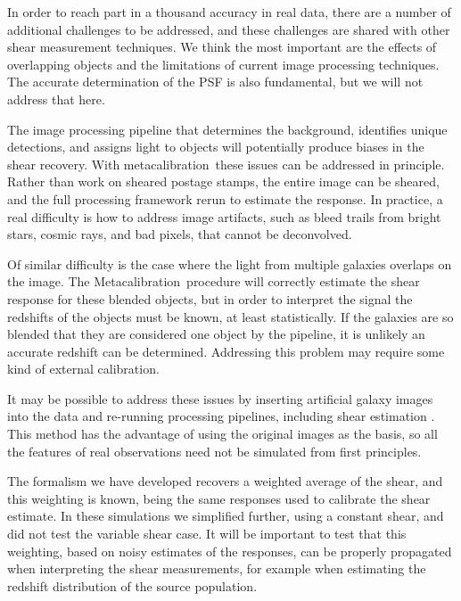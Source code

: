\documentclass[iop]{emulateapj}
\newcommand{\mcal}{metacalibration}
\newcommand{\Mcal}{Metacalibration}
\begin{document}
In order to reach part in a thousand accuracy in real data, there are a number
of additional challenges to be addressed, and these challenges are shared with
other shear measurement techniques. We think the most important are the effects
of overlapping objects and the limitations of current image processing
techniques.  The accurate determination of the PSF is also fundamental, but we
will not address that here.

The image processing pipeline that  determines the background, identifies
unique detections, and assigns light to objects will potentially produce biases
in the shear recovery.  With \mcal\ these issues can be addressed in principle.
Rather than work on sheared postage stamps, the entire image can be sheared,
and the full processing framework rerun to estimate the response.  In practice,
a real difficulty is how to address image artifacts, such as bleed trails from
bright stars, cosmic rays, and bad pixels, that cannot be deconvolved.

Of similar difficulty is the case where the light from multiple galaxies
overlaps on the image.  The \Mcal\ procedure will correctly estimate the shear
response for these blended objects, but in order to interpret the signal the
redshifts of the objects must be known, at least statistically.  If the
galaxies are so blended that they are considered one object by the pipeline, it
is unlikely an accurate redshift can be determined.  Addressing this problem
may require some kind of external calibration.

It may be possible to address these issues by inserting artificial galaxy
images into the data and re-running processing pipelines, including shear
estimation \citep{Balrog2016}.  This method has the advantage of using the
original images as the basis, so all the features of real observations need not
be simulated from first principles.

The formalism we have developed recovers a weighted average of the shear, and
this weighting is known, being the same responses used to calibrate the shear
estimate.  In these simulations we simplified further, using a constant shear,
and did not test the variable shear case.  It will be important to test that
this weighting, based on noisy estimates of the responses, can be properly
propagated when interpreting the shear measurements, for example when
estimating the redshift distribution of the source population.
\end{document}
